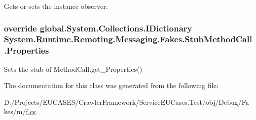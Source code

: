 Gets or sets the instance observer.

\hypertarget{class_system_1_1_runtime_1_1_remoting_1_1_messaging_1_1_fakes_1_1_stub_method_call_a9e6924dbd84099f17863311202d355aa}{
\subsubsection[{Properties}]{\setlength{\rightskip}{0pt plus 5cm}override global.\-System.\-Collections.\-I\-Dictionary System.\-Runtime.\-Remoting.\-Messaging.\-Fakes.\-Stub\-Method\-Call.\-Properties\hspace{0.3cm}{\ttfamily [get]}}}\label{class_system_1_1_runtime_1_1_remoting_1_1_messaging_1_1_fakes_1_1_stub_method_call_a9e6924dbd84099f17863311202d355aa}


Sets the stub of Method\-Call.\-get\-\_\-\-Properties()



The documentation for this class was generated from the following file\-:\begin{DoxyCompactItemize}
\item 
D\-:/\-Projects/\-E\-U\-C\-A\-S\-E\-S/\-Crawler\-Framework/\-Service\-E\-U\-Cases.\-Test/obj/\-Debug/\-Fakes/m/\hyperlink{m_2f_8cs}{f.\-cs}\end{DoxyCompactItemize}
